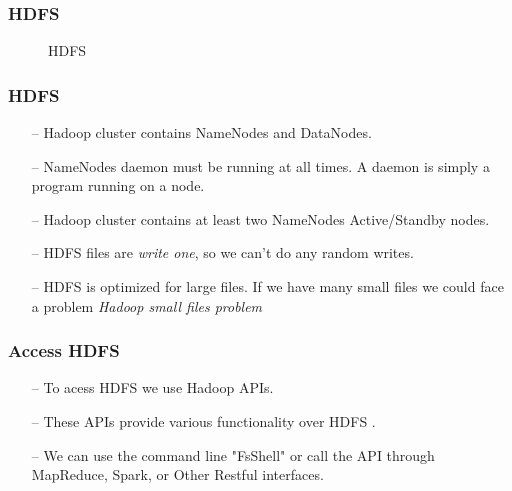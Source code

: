 \begin{frame}[c]{ }
	\frametitle{HDFS }
		\begin{figure}
		\centering
		
		\caption{HDFS } \label{fig:hdfs}
	\end{figure}
\end{frame}
\begin{frame}[c]{ }
	\frametitle{HDFS }
	
	
	\begin{itemize}  [<+->]
		\item [--] {\footnotesize Hadoop cluster contains NameNodes and DataNodes.}
		\item [--] {\footnotesize NameNodes daemon must be running at all times. A daemon is simply a program running on a node. }
		\item [--] {\footnotesize Hadoop cluster contains at least two NameNodes Active/Standby nodes.}
		\item [--] {\footnotesize HDFS files are \textit{write one}, so we can't do any random writes.}
		\item [--] {\footnotesize HDFS is optimized for large files. If we have many small files we could face a problem \textit{Hadoop small files problem}}
			\end{itemize}
		
\end{frame}
\begin{frame}[c]{ }
	\frametitle{Access HDFS }
	
	
	\begin{itemize}  [<+->]
		\item [--] {\footnotesize To acess HDFS we use Hadoop APIs. }
		\item [--] {\footnotesize These APIs provide various functionality over HDFS . }
		\item [--] {\footnotesize We can use the command line "FsShell" or call the API through MapReduce, Spark, or Other Restful interfaces.}
		
		
	\end{itemize}
	
\end{frame}
